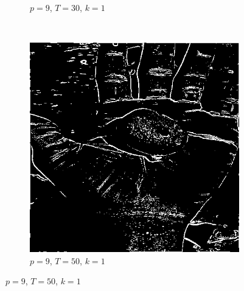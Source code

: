 \documentclass{article}
\begin{document}
\begin{enumerate}[label=(\alph*)]
\begin{figure}
\begin{subfigure}[b]{0.3\textwidth}
            \caption{$p = 9$, $T = 30$, $k = 1$}
        \end{subfigure}
        ~
        \begin{subfigure}[b]{0.3\textwidth}
            \includegraphics[width=\textwidth]{img/ED1_9_50_1.png}
            \caption{$p = 9$, $T = 50$, $k = 1$}
        \end{subfigure}
        


\end{figure}
\end{enumerate}
\end{document}
